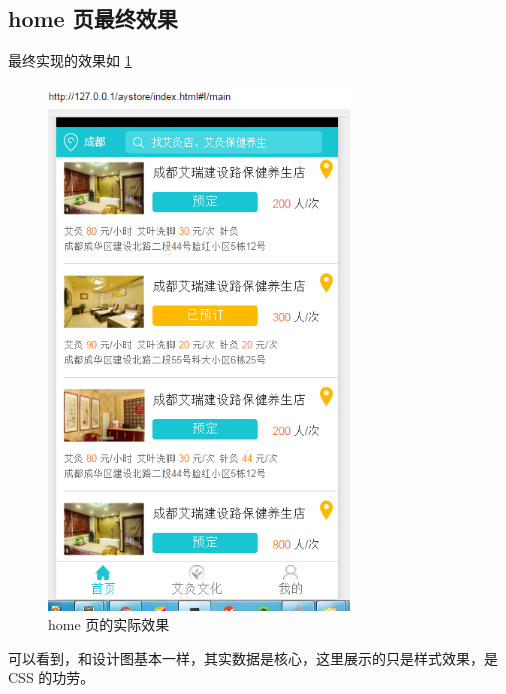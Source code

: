     \subsection{home 页最终效果}
      \label{subsec:home_页最终效果}
        最终实现的效果如 \ref{fig:home1}
        \begin{figure}[H]
          \centering
          \includegraphics[width=8cm]{./img/home1.png}
          \caption{home 页的实际效果}
          \label{fig:home1}
        \end{figure}
        可以看到，和设计图基本一样，其实数据是核心，这里展示的只是样式效果，是 CSS 的功劳。

